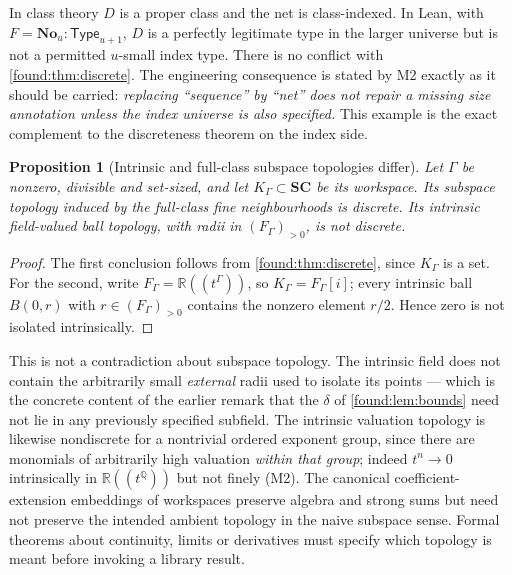 \documentclass[11pt,letterpaper]{article}
\numberwithin{equation}{section}
\newtheorem{proposition}[theorem]{Proposition}
\theoremstyle{definition}
\theoremstyle{remark}
\newcommand{\No}{\mathbf{No}}
\newcommand{\SC}{\mathbf{SC}}
\newcommand{\R}{\mathbb R}
\newcommand{\Q}{\mathbb Q}
\newcommand{\Type}{\mathsf{Type}}
\begin{document}
In class theory $D$ is a proper class and the net is class-indexed. In Lean,
with $F=\No_u:\Type_{u+1}$, $D$ is a perfectly legitimate type in the larger
universe but is not a permitted $u$-small index type. There is no conflict with
\cref{found:thm:discrete}. The engineering consequence is stated by M2 exactly
as it should be carried: \emph{replacing ``sequence'' by ``net'' does not repair
a missing size annotation unless the index universe is also specified.} This
example is the exact complement to the discreteness theorem on the index side.

\begin{proposition}[Intrinsic and full-class subspace topologies differ]\label{found:prop:twotopologies}
Let $\Gamma$ be nonzero, divisible and set-sized, and let
$K_\Gamma\subset\SC$ be its workspace. Its subspace topology induced by the
full-class fine neighbourhoods is discrete. Its intrinsic field-valued ball
topology, with radii in $(F_\Gamma)_{>0}$, is not discrete.
\end{proposition}
\begin{proof}
The first conclusion follows from \cref{found:thm:discrete}, since $K_\Gamma$ is
a set. For the second, write $F_\Gamma=\R((t^\Gamma))$, so
$K_\Gamma=F_\Gamma[i]$; every intrinsic ball $B(0,r)$ with
$r\in(F_\Gamma)_{>0}$ contains the nonzero element $r/2$. Hence zero is not
isolated intrinsically.
\end{proof}

This is not a contradiction about subspace topology. The intrinsic field does
not contain the arbitrarily small \emph{external} radii used to isolate its
points --- which is the concrete content of the earlier remark that the $\delta$
of \cref{found:lem:bounds} need not lie in any previously specified subfield.
The intrinsic valuation topology is likewise nondiscrete for a nontrivial
ordered exponent group, since there are monomials of arbitrarily high valuation
\emph{within that group}; indeed $t^n\to0$ intrinsically in $\R((t^\Q))$ but not
finely (M2). The canonical coefficient-extension embeddings of workspaces
preserve algebra and strong sums but need not preserve the intended ambient
topology in the naive subspace sense.
Formal theorems about continuity, limits or derivatives must specify which
topology is meant before invoking a library result.
\end{document}
